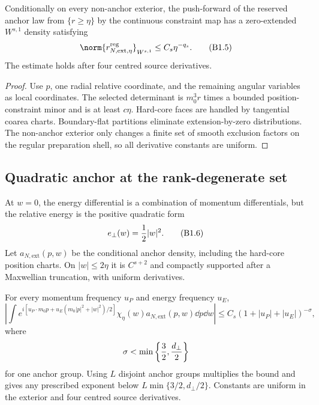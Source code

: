 \begin{lemma}
\label{lem:r31-b1-regular}
Conditionally on every non-anchor exterior, the push-forward of the reserved
anchor law from $\{r\ge\eta\}$ by the continuous constraint map has a
zero-extended $W^{s,1}$ density satisfying
\[
 \norm{r^{\rm reg}_{N,\mathrm{ext},\eta}}_{W^{s,1}}
 \le C_s\eta^{-q_s}.                                      \tag{B1.5}
\]
The estimate holds after four centred source derivatives.
\end{lemma}

\begin{proof}
Use $p$, one radial relative coordinate, and the remaining angular variables
as local coordinates.  The selected determinant is $m_0^3r$ times a bounded
position-constraint minor and is at least $c\eta$.  Hard-core faces are
handled by tangential coarea charts.  Boundary-flat partitions eliminate
extension-by-zero distributions.  The non-anchor exterior only changes a
finite set of smooth exclusion factors on the regular preparation shell, so
all derivative constants are uniform.
\end{proof}

\subsection{Quadratic anchor at the rank-degenerate set}

At $w=0$, the energy differential is a combination of momentum differentials,
but the relative energy is the positive quadratic form
\[
 e_\perp(w)={1\over2}|w|^2.                               \tag{B1.6}
\]
Let $a_{N,\mathrm{ext}}(p,w)$ be the conditional anchor density, including the
hard-core position charts.  On $|w|\le2\eta$ it is $C^{s+2}$ and compactly
supported after a Maxwellian truncation, with uniform derivatives.

\begin{lemma}
\label{lem:r31-b1-quadratic}
For every momentum frequency $u_P$ and energy frequency $u_E$,
\begin{equation}\tag{B1.7}
 \left|\int e^{i[u_P\cdot m_0p+u_E(m_0|p|^2+|w|^2)/2]}
       \chi_\eta(w)a_{N,\mathrm{ext}}(p,w)\dd p\dd w\right|
 \le C_s(1+|u_P|+|u_E|)^{-\sigma},
\end{equation}
where
\[
 \sigma<\min\left\{{3\over2},{d_\perp\over2}\right\}
\]
for one anchor group.  Using $L$ disjoint anchor groups multiplies the bound
and gives any prescribed exponent below
$L\min\{3/2,d_\perp/2\}$.  Constants are uniform in the exterior and four
centred source derivatives.
\end{lemma}


